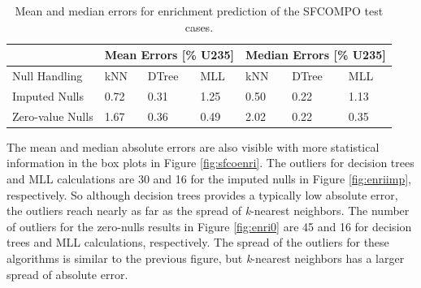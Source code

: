 \begin{table}[!htb]
  \centering
  \begin{tabular}{@{}m{1.5in}llllll@{}}
    \toprule
                     & \multicolumn{3}{m{2in}}{Mean Errors [\% U235]} & \multicolumn{3}{l}{Median Errors [\% U235]} \\ \toprule
    Null Handling    & kNN           & DTree          & MLL          & kNN            & DTree          & MLL    \\ \midrule
    Imputed Nulls    & 0.72          & 0.31           & 1.25         & 0.50           & 0.22           & 1.13   \\
    Zero-value Nulls & 1.67          & 0.36           & 0.49         & 2.02           & 0.22           & 0.35   \\ \bottomrule
  \end{tabular}
  \caption{Mean and median errors for enrichment prediction of the \gls{SFCOMPO} 
           test cases.}
  \label{tbl:sfcoenri}
\end{table}

The mean and median absolute errors are also visible with more statistical
information in the box plots in Figure \ref{fig:sfcoenri}. The outliers for
decision trees and \gls{MLL} calculations are 30 and 16 for the imputed nulls
in Figure \ref{fig:enriimp}, respectively. So although decision trees provides
a typically low absolute error, the outliers reach nearly as far as the spread
of \textit{k}-nearest neighbors. The number of outliers for the zero-nulls
results in Figure \ref{fig:enri0} are 45 and 16 for decision trees and
\gls{MLL} calculations, respectively.  The spread of the outliers for these
algorithms is similar to the previous figure, but \textit{k}-nearest neighbors
has a larger spread of absolute error.

